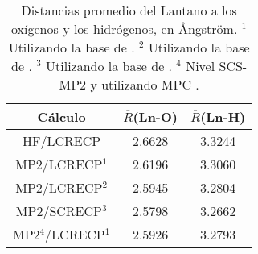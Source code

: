 \begin{table}[h!]
\centering  %
\caption{\footnotesize Distancias promedio del Lantano a los ox\'igenos
y los hidr\'ogenos, en {\AA}ngstr\"om.
{\footnotesize $^1$ Utilizando la base de \cite{Dolg1993}.} 
{\footnotesize $^2$ Utilizando la base de \cite{Yang2005}.}
{\footnotesize $^3$ Utilizando la base de \cite{Cao2002}.}  
{\footnotesize $^4$ Nivel SCS-MP2 \citep{Grim2003} y utilizando MPC 
\citep{Toma2005}.}}
\begin{tabular}{c|cc}\hline\hline
C\'alculo & $\overline R$(Ln-O) & $\overline R$(Ln-H) \\ \hline
HF/LCRECP & 2.6628 & 3.3244 \\ 
MP2/LCRECP$^1$ & 2.6196 & 3.3060  \\ 
MP2/LCRECP$^2$ & 2.5945 & 3.2804  \\ 
MP2/SCRECP$^3$ & 2.5798 & 3.2662  \\ 
MP2$^4$/LCRECP$^1$ & 2.5926 & 3.2793  \\ 
\hline \end{tabular}\label{tD9+0}\end{table}
